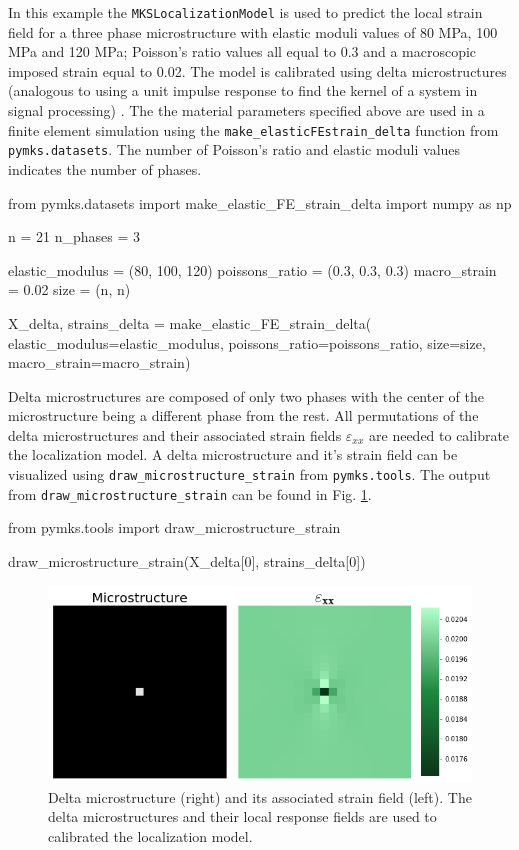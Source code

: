 \documentclass{bmcart}
\begin{document}
    In this example the \texttt{MKSLocalizationModel} is used to predict the
local strain field for a three phase microstructure with elastic moduli
values of 80 MPa, 100 MPa and 120 MPa; Poisson's ratio values all equal
to 0.3 and a macroscopic imposed strain equal to 0.02. The model is
calibrated using delta microstructures (analogous to using a unit
impulse response to find the kernel of a system in signal processing)
\cite{landi2010multi}. The the material parameters specified above
are used in a finite element simulation using the
\texttt{make\_elasticFEstrain\_delta} function from
\texttt{pymks.datasets}. The number of Poisson's ratio and elastic
moduli values indicates the number of phases.

\begin{_input}
from pymks.datasets import make_elastic_FE_strain_delta
import numpy as np

n = 21
n_phases = 3

elastic_modulus = (80, 100, 120)
poissons_ratio = (0.3, 0.3, 0.3)
macro_strain = 0.02
size = (n, n)

X_delta, strains_delta = make_elastic_FE_strain_delta(
    elastic_modulus=elastic_modulus,
    poissons_ratio=poissons_ratio,
    size=size, macro_strain=macro_strain)
\end{_input}
    Delta microstructures are composed of only two phases with the
center of the microstructure being a different phase from the rest. All
permutations of the delta microstructures and their associated strain
fields \(\varepsilon_{xx}\) are needed to calibrate the localization model.
A delta microstructure and it's strain field can be visualized using
\texttt{draw\_microstructure\_strain} from \texttt{pymks.tools}.
The output from \texttt{draw\_microstructure\_strain} can be found
in Fig. \ref{fig:drawMicroStrain}.

\begin{_input}
from pymks.tools import draw_microstructure_strain

draw_microstructure_strain(X_delta[0], strains_delta[0])
\end{_input}

\begin{figure}
    \centering
    \includegraphics[scale=.54]{pymks_paper_localization_files/pymks_paper_localization_5_0.png}
    \caption{Delta microstructure (right) and its associated strain field (left). The delta
    microstructures and their local response fields are used to calibrated the localization model.}
    \label{fig:drawMicroStrain}
\end{figure}
\end{document}
